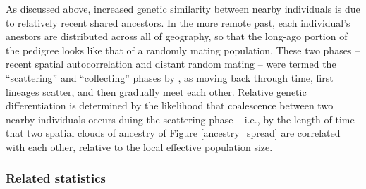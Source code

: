 \documentclass{ar-1col}
\newcommand{\plr}[1]{{\color{green}{#1}}}
\newcommand{\todo}[1]{{\textbf{\color{red}{#1}}}}
\begin{document}
As discussed above,
increased genetic similarity between nearby individuals
is due to relatively recent shared ancestors.
In the more remote past, each individual's anestors are distributed across
all of geography,
so that the long-ago portion of the pedigree looks like that of a randomly mating population.
These two phases -- recent spatial autocorrelation and distant random mating --
were termed the ``scattering'' and ``collecting'' phases by \citet{wilkins2004separationoftimescales},
as moving back through time, first lineages scatter, and then gradually meet each other.
\plr{(is that the right way round?)}
Relative genetic differentiation
is determined by the likelihood that coalescence between two nearby individuals
occurs duing the scattering phase
-- i.e., by the length of time that two spatial clouds of ancestry of Figure \ref{ancestry_spread}
are correlated with each other,
relative to the local effective population size.



\todo{tidy and conclude}


%
%        
%
%
%
%



\subsubsection{Related statistics}
\end{document}
